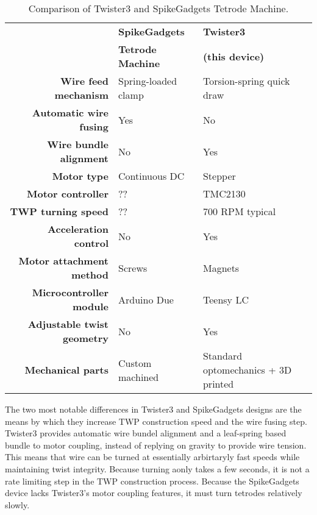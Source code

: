 \documentclass[11pt,a4paper]{article}
\begin{document}
\begin{table}[!htbp]
\centering
\caption{Comparison of Twister3 and SpikeGadgets Tetrode Machine.}
\label{t:compare}

\begin{tabular}{rll}
\toprule
&
\textbf{SpikeGadgets} &
\textbf{Twister3} \\
&
\textbf{Tetrode Machine} &
\textbf{(this device)} \\

\cmidrule{2-3}

\textbf{Wire feed mechanism}  &  Spring-loaded clamp & Torsion-spring quick draw  \\
\textbf{Automatic wire fusing}   & Yes     &  No \\
\textbf{Wire bundle alignment}  &  No & Yes \\
\textbf{Motor type}  & Continuous DC       &  Stepper \\
\textbf{Motor controller}   & ??     &  TMC2130 \\
\textbf{TWP turning speed}   & ??     &  700 RPM typical \\
\textbf{Acceleration control}   & No     &  Yes \\
\textbf{Motor attachment method}   & Screws     &  Magnets \\
\textbf{Microcontroller module}   & Arduino Due     &  Teensy LC \\
\textbf{Adjustable twist geometry }   & No     &  Yes \\
\textbf{Mechanical parts}   & Custom machined      &  Standard optomechanics + 3D printed \\
\bottomrule
\end{tabular}
\end{table}

The two most notable differences in Twister3 and SpikeGadgets designs are the
means by which they increase TWP construction speed and the wire fusing step.
Twister3 provides automatic wire bundel alignment and a leaf-spring based
bundle to motor coupling, instead of replying on gravity to provide wire
tension. This means that wire can be turned at essentially arbirtaryly fast
speeds while maintaining twist integrity. Because turning aonly takes a few
seconds, it is not a rate limiting step in the TWP construction process.
Because the SpikeGadgets device lacks Twister3's motor coupling features, it
must turn tetrodes relatively slowly. 
\end{document}

